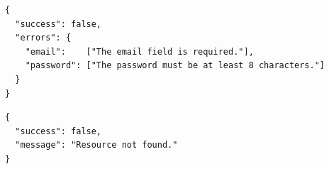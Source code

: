 \begin{lstlisting}[style=json, caption={HTTP 422 validation failure envelope.}]
{
  "success": false,
  "errors": {
    "email":    ["The email field is required."],
    "password": ["The password must be at least 8 characters."]
  }
}
\end{lstlisting}

\begin{lstlisting}[style=json, caption={HTTP 404 resource not found envelope.}]
{
  "success": false,
  "message": "Resource not found."
}
\end{lstlisting}

